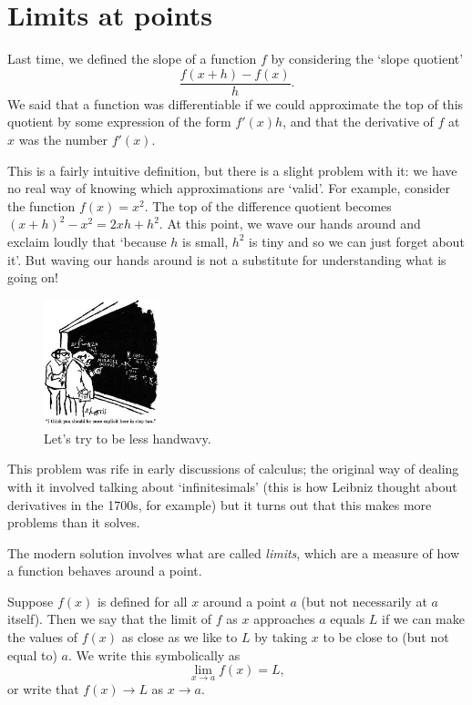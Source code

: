 \section{Limits at points}
Last time, we defined the slope of a function $ f $ by considering the `slope quotient'
\begin{equation}
  \frac{f(x + h) - f(x)}{h}.
\end{equation}
We said that a function was differentiable if we could approximate the top of this quotient by
some expression of the form $ f'(x) h $, and that the derivative of $ f $ at $ x $ was the
number $ f'(x) $.

This is a fairly intuitive definition, but there is a slight problem with it: we have no real
way of knowing which approximations are `valid'. For example, consider the function $ f(x) = x^2 $.
The top of the difference quotient becomes $ (x + h)^2 - x^2 = 2xh + h^2 $. At this point, we
wave our hands around and exclaim loudly that `because $ h $ is small, $ h^2 $ is tiny and so we
can just forget about it'. But waving our hands around is not a substitute for understanding what
is going on!

\begin{figure}
  \centering
  \includegraphics[width=0.3\textwidth]{handwavy}
  \caption{Let's try to be less handwavy.}
\end{figure}

This problem was rife in early discussions of calculus; the original way of dealing with it
involved talking about `infinitesimals' (this is how Leibniz thought about derivatives in the 1700s, for
example) but it turns out that this makes more problems than it solves.

The modern solution involves what are called \emph{limits}, which are a measure of how a
function behaves around a point.

\begin{defn}
  Suppose $ f(x) $ is defined for all $ x $ around a point $ a $ (but not necessarily at $ a $ itself).
  Then we say that the limit of $ f $ as $ x $ approaches $ a $ equals $ L $ if we can make the values of $ f(x) $
  as close as we like to $ L $ by taking $ x $ to be close to (but not equal to) $ a $. We write this symbolically as
  \begin{displaymath}
    \lim_{x \to a} f(x) = L,
  \end{displaymath}
  or write that $ f(x) \to L $ as $ x \to a $.
\end{defn}

